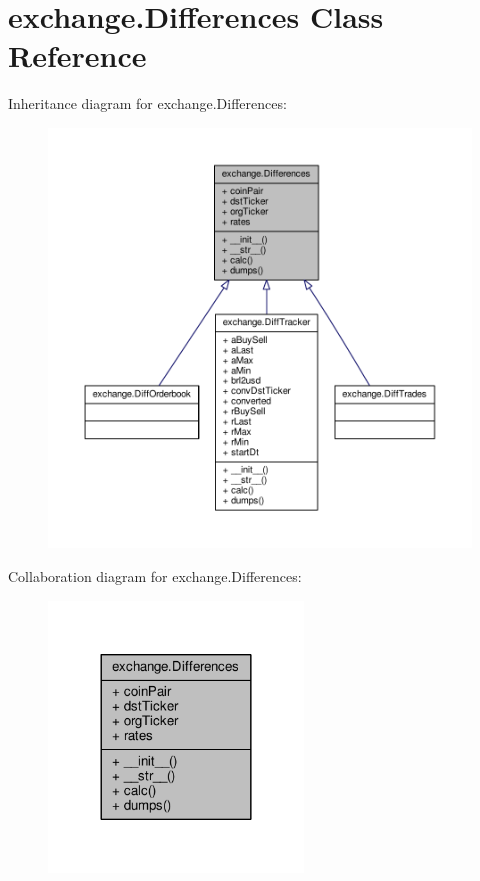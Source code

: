 \hypertarget{classexchange_1_1_differences}{}\section{exchange.\+Differences Class Reference}
\label{classexchange_1_1_differences}


Inheritance diagram for exchange.\+Differences\+:
\nopagebreak
\begin{figure}[H]
\begin{center}
\leavevmode
\includegraphics[width=350pt]{classexchange_1_1_differences__inherit__graph}
\end{center}
\end{figure}


Collaboration diagram for exchange.\+Differences\+:
\nopagebreak
\begin{figure}[H]
\begin{center}
\leavevmode
\includegraphics[width=192pt]{classexchange_1_1_differences__coll__graph}
\end{center}
\end{figure}
